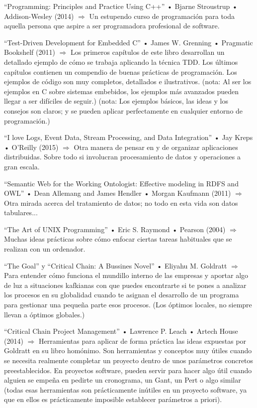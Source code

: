 \documentclass[spanish,12pt,a4paper,final,oneside]{book}
\begin{document}
``Programming: Principles and Practice Using C++'' • Bjarne Stroustrup • Addison-Wesley (2014) $\Rightarrow$ Un estupendo curso de programación para toda aquella persona que aspire a ser programadora profesional de software. 

``Test-Driven Development for Embedded C'' • James W. Grenning • Pragmatic Bookshelf (2011) $\Rightarrow$ Los primeros capítulos de este libro desarrollan un detallado ejemplo de cómo se trabaja aplicando la técnica TDD. Los últimos capítulos contienen un compendio de buenas prácticas de programación. Los ejemplos de código son muy completos, detallados e ilustrativos. (nota: Al ser los ejemplos en C sobre sistemas embebidos, los ejemplos más avanzados pueden llegar a ser difíciles de seguir.) (nota: Los ejemplos básicos, las ideas y los consejos son claros; y se pueden aplicar perfectamente en cualquier entorno de programación.)

``I love Logs, Event Data, Stream Processing, and Data Integration'' • Jay Kreps • O'Reilly (2015) $\Rightarrow$ Otra manera de pensar en y de organizar aplicaciones distribuidas. Sobre todo si involucran procesamiento de datos y operaciones a gran escala.

``Semantic Web for the Working Ontologist: Effective modeling in RDFS and OWL'' • Dean Allemang and James Hendler • Morgan Kaufmann (2011) $\Rightarrow$ Otra mirada acerca del tratamiento de datos; no todo en esta vida son datos tabulares...

``The Art of UNIX Programming'' • Eric S. Raymond • Pearson (2004) $\Rightarrow$ Muchas ideas prácticas sobre cómo enfocar ciertas tareas habituales que se realizan con un ordenador.

``The Goal'' y ``Critical Chain: A Bussines Novel'' • Eliyahu M. Goldratt $\Rightarrow$ Para entender cómo funciona el mundillo interno de las empresas y aportar algo de luz a situaciones kafkianas con que puedes encontrarte si te pones a analizar los procesos en su globalidad cuando te asignan el desarrollo de un programa para gestionar una pequeña parte esos procesos. (Los óptimos locales, no siempre llevan a óptimos globales.)

``Critical Chain Project Management'' • Lawrence P. Leach • Artech House (2014) $\Rightarrow$ Herramientas para aplicar de forma práctica las ideas expuestas por Goldratt en su libro homónimo. Son herramientas y conceptos muy útiles cuando se necesita realmente completar un proyecto dentro de unos parámetros concretos preestablecidos. En proyectos software, pueden servir para hacer algo útil cuando alguien se empeña en pedirte un cronograma, un Gant, un Pert o algo similar (todas esas herramientas son prácticamente inútiles en un proyecto software, ya que en ellos es prácticamente imposible establecer parámetros a priori).
\end{document}
